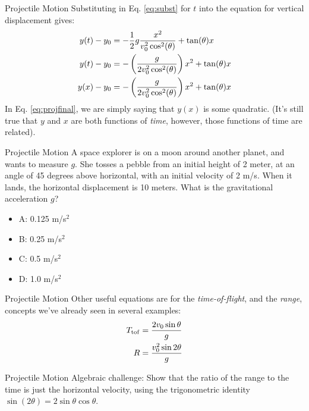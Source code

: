 \documentclass{beamer}
\begin{document}
\begin{frame}{Projectile Motion}
Substituting in Eq. \ref{eq:subst} for $t$ into the equation for vertical displacement gives:\\
\begin{align}
y(t) - y_{\rm 0} &= -\frac{1}{2}g\frac{x^2}{v_{\rm 0}^2\cos^2(\theta)} + \tan(\theta) x \\
y(t) - y_{\rm 0} &= -\left(\frac{g}{2v_{\rm 0}^2\cos^2(\theta)}\right)x^2 + \tan(\theta) x \\
y(x) - y_{\rm 0} &= -\left(\frac{g}{2v_{\rm 0}^2\cos^2(\theta)}\right)x^2 + \tan(\theta) x \label{eq:projfinal}
\end{align}
In Eq. \ref{eq:projfinal}, we are simply saying that $y(x)$ is some quadratic.  (It's still true that $y$ and $x$ are both functions of \textit{time}, however, those functions of time are related).
\end{frame}

\begin{frame}{Projectile Motion}
A space explorer is on a moon around another planet, and wants to measure $g$.  She tosses a pebble from an initial height of 2 meter, at an angle of 45 degrees above horizontal, with an initial velocity of 2 m/s.  When it lands, the horizontal displacement is 10 meters.  What is the gravitational acceleration $g$?
\begin{itemize}
\item A: 0.125 m/s$^2$
\item B: 0.25 m/s$^2$
\item C: 0.5 m/s$^2$
\item D: 1.0 m/s$^2$
\end{itemize}
\end{frame}

\begin{frame}{Projectile Motion}
Other useful equations are for the \textit{time-of-flight}, and the \textit{range}, concepts we've already seen in several examples: \\
\begin{align}
T_{\rm tof} &= \frac{2v_{\rm 0}\sin\theta}{g} \\
R &= \frac{v_{\rm 0}^2\sin2\theta}{g}
\end{align}
\end{frame}

\begin{frame}{Projectile Motion}
\alert{Algebraic challenge}: Show that the ratio of the range to the time is just the horizontal velocity, using the trigonometric identity $\sin(2\theta) = 2\sin\theta\cos\theta$.
\end{frame}
\end{document}
